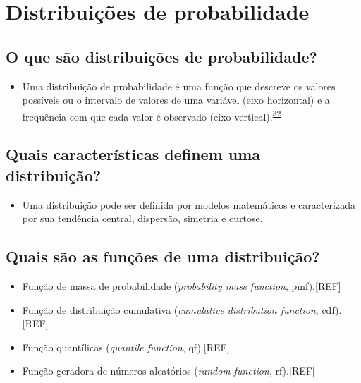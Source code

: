 \documentclass[
  a4paper,
]{book}
\providecommand{\tightlist}{%
  \setlength{\itemsep}{0pt}\setlength{\parskip}{0pt}}
\begin{document}
\hypertarget{distribuicoes}{%
\section{Distribuições de probabilidade}\label{distribuicoes}}

\hypertarget{o-que-suxe3o-distribuiuxe7uxf5es-de-probabilidade}{%
\subsection{O que são distribuições de probabilidade?}\label{o-que-suxe3o-distribuiuxe7uxf5es-de-probabilidade}}

\begin{itemize}
\tightlist
\item
  Uma distribuição de probabilidade é uma função que descreve os valores possíveis ou o intervalo de valores de uma variável (eixo horizontal) e a frequência com que cada valor é observado (eixo vertical).\textsuperscript{\protect\hyperlink{ref-vetter2017}{32}}
\end{itemize}

\hypertarget{quais-caracteruxedsticas-definem-uma-distribuiuxe7uxe3o}{%
\subsection{Quais características definem uma distribuição?}\label{quais-caracteruxedsticas-definem-uma-distribuiuxe7uxe3o}}

\begin{itemize}
\tightlist
\item
  Uma distribuição pode ser definida por modelos matemáticos e caracterizada por sua tendência central, dispersão, simetria e curtose.
\end{itemize}

\hypertarget{quais-suxe3o-as-funuxe7uxf5es-de-uma-distribuiuxe7uxe3o}{%
\subsection{Quais são as funções de uma distribuição?}\label{quais-suxe3o-as-funuxe7uxf5es-de-uma-distribuiuxe7uxe3o}}

\begin{itemize}
\item
  Função de massa de probabilidade (\emph{probability mass function}, pmf).{[}REF{]}
\item
  Função de distribuição cumulativa (\emph{cumulative distribution function}, cdf).{[}REF{]}
\item
  Função quantílicas (\emph{quantile function}, qf).{[}REF{]}
\item
  Função geradora de números aleatórios (\emph{random function}, rf).{[}REF{]}
\end{itemize}
\end{document}
